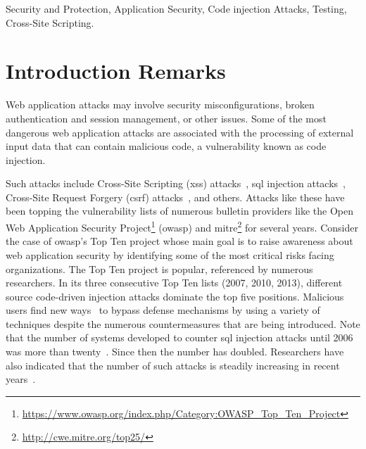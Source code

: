 \documentclass[conference]{IEEEtran}
\begin{document}
\begin{IEEEkeywords}
Security and Protection, Application Security, Code injection Attacks,
Testing, Cross-Site Scripting.
\end{IEEEkeywords}

\IEEEpeerreviewmaketitle

\section{Introduction Remarks}

Web application attacks may involve security misconfigurations, broken
authentication and session management, or other issues. Some of the
most dangerous web application attacks are associated with the
processing of external input data that can contain malicious code, a
vulnerability known as code injection.

Such attacks include Cross-Site Scripting ({\sc xss})
attacks~\cite{SG07}, {\sc sql} injection attacks~\cite{RL12b},
Cross-Site Request Forgery ({\sc csrf}) attacks~\cite{LZRL09}, and
others. Attacks like these have been topping the vulnerability lists
of numerous bulletin providers like the Open Web Application Security
Project\footnote{\url{https://www.owasp.org/index.php/Category:OWASP_Top_Ten_Project}}
({\sc owasp}) and {\sc
  mitre}\footnote{\url{http://cwe.mitre.org/top25/}} for several
years. Consider the case of {\sc owasp}'s Top Ten project whose main
goal is to raise awareness about web application security by
identifying some of the most critical risks facing organizations. The
Top Ten project is popular, referenced by numerous researchers. In its
three consecutive Top Ten lists (2007, 2010, 2013), different
source code-driven injection attacks dominate the top five
positions. Malicious users find new ways~\cite{HNSHS12,DKH14}
to bypass defense mechanisms by using a variety of
techniques despite the numerous countermeasures
that are being introduced. Note that the number of systems developed
to counter {\sc sql} injection attacks until 2006 was more than
twenty~\cite{HVO06}. Since then the number has doubled. Researchers
have also indicated that the number of such attacks is steadily
increasing in recent years~\cite{SSL12}.
\end{document}

